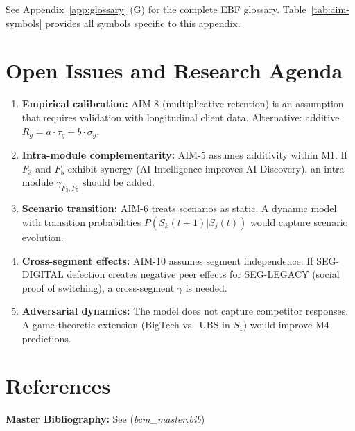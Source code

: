 See Appendix~\ref{app:glossary} (G) for the complete EBF glossary.
Table~\ref{tab:aim-symbols} provides all symbols specific to this appendix.


\section{Open Issues and Research Agenda}
\label{sec:aim-open}

\begin{enumerate}
\item \textbf{Empirical calibration:} AIM-8 (multiplicative retention) is an
assumption that requires validation with longitudinal client data.
Alternative: additive $R_g = a \cdot \tau_g + b \cdot \sigma_g$.

\item \textbf{Intra-module complementarity:} AIM-5 assumes additivity within M1.
If $F_3$ and $F_5$ exhibit synergy (AI Intelligence improves AI Discovery),
an intra-module $\gamma_{F_3, F_5}$ should be added.

\item \textbf{Scenario transition:} AIM-6 treats scenarios as static.
A dynamic model with transition probabilities $P(S_k(t+1) | S_j(t))$
would capture scenario evolution.

\item \textbf{Cross-segment effects:} AIM-10 assumes segment independence.
If SEG-DIGITAL defection creates negative peer effects for SEG-LEGACY
(social proof of switching), a cross-segment $\gamma$ is needed.

\item \textbf{Adversarial dynamics:} The model does not capture competitor
responses. A game-theoretic extension (BigTech vs.\ UBS in $S_1$) would
improve M4 predictions.
\end{enumerate}


\section{References}
\label{sec:aim-references}

\textbf{Master Bibliography:} See \nocite{bcm_master} (\textit{bcm\_master.bib})

